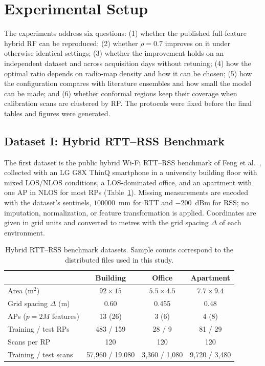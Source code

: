 \section{Experimental Setup}
\label{sec:experimental_setup}

The experiments address six questions: (1) whether the published full-feature hybrid RF can be reproduced; (2) whether $\rho=0.7$ improves on it under otherwise identical settings; (3) whether the improvement holds on an independent dataset and across acquisition days without retuning; (4) how the optimal ratio depends on radio-map density and how it can be chosen; (5) how the configuration compares with literature ensembles and how small the model can be made; and (6) whether conformal regions keep their coverage when calibration scans are clustered by RP. The protocols were fixed before the final tables and figures were generated.

\subsection{Dataset I: Hybrid RTT--RSS Benchmark}
\label{subsec:dataset_original}

The first dataset is the public hybrid Wi-Fi RTT--RSS benchmark of Feng et al.~\cite{feng2026robust}, collected with an LG G8X ThinQ smartphone in a university building floor with mixed LOS/NLOS conditions, a LOS-dominated office, and an apartment with one AP in NLOS for most RPs (Table~\ref{tab:dataset_summary}). Missing measurements are encoded with the dataset's sentinels, $100000$~mm for RTT and $-200$~dBm for RSS; no imputation, normalization, or feature transformation is applied. Coordinates are given in grid units and converted to metres with the grid spacing $\Delta$ of each environment.

\begin{table}[!t]
	\centering
	\caption{Hybrid RTT--RSS benchmark datasets. Sample counts correspond to the distributed files used in this study.}
	\label{tab:dataset_summary}
	\footnotesize
	\setlength{\tabcolsep}{3.5pt}
	\begin{tabular}{lccc}
		\toprule
		 & Building & Office & Apartment \\
		\midrule
		Area (m$^2$) & $92\times15$ & $5.5\times4.5$ & $7.7\times9.4$ \\
		Grid spacing $\Delta$ (m) & 0.60 & 0.455 & 0.48 \\
		APs ($p=2M$ features) & 13 (26) & 3 (6) & 4 (8) \\
		Training / test RPs & 483 / 159 & 28 / 9 & 81 / 29 \\
		Scans per RP & 120 & 120 & 120 \\
		Training / test scans & 57,960 / 19,080 & 3,360 / 1,080 & 9,720 / 3,480 \\
		\bottomrule
	\end{tabular}
\end{table}

